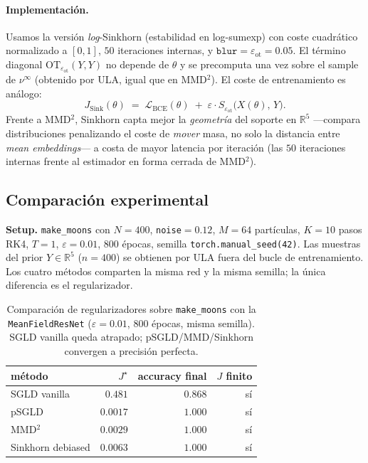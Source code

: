 \documentclass[11pt, a4paper]{article}
\theoremstyle{definition}
\newcommand{\R}{\mathbb{R}}
\newcommand{\eps}{\varepsilon}
\begin{document}
\paragraph{Implementación.} Usamos la versión \emph{log}-Sinkhorn
(estabilidad en log-sumexp) con coste cuadrático normalizado a
$[0,1]$, $50$ iteraciones internas, y $\texttt{blur}=
\eps_{\mathrm{ot}}=0.05$. El término diagonal
$\mathrm{OT}_{\eps_{\mathrm{ot}}}(Y, Y)$ no depende de $\theta$ y se
precomputa una vez sobre el sample de $\nu^\infty$ (obtenido por
ULA, igual que en MMD$^2$). El coste de entrenamiento es análogo:
\[
  J_{\mathrm{Sink}}(\theta) \;=\;
  \mathcal L_{\mathrm{BCE}}(\theta)
  \;+\; \eps\cdot S_{\eps_{\mathrm{ot}}}\bigl(X(\theta),\,Y\bigr).
\]
Frente a MMD$^2$, Sinkhorn capta mejor la \emph{geometría} del
soporte en $\R^5$ ---compara distribuciones penalizando el coste de
\emph{mover} masa, no solo la distancia entre \emph{mean
embeddings}--- a costa de mayor latencia por iteración (las $50$
iteraciones internas frente al estimador en forma cerrada de MMD$^2$).

\subsection{Comparación experimental}
\label{sec:reg-moons-exp}

\textbf{Setup.} \texttt{make\_moons} con $N=400$,
\texttt{noise}$=0.12$, $M=64$ partículas, $K=10$ pasos
RK4, $T=1$, $\eps=0.01$, $800$ épocas, semilla
\texttt{torch.manual\_seed(42)}. Las muestras del prior
$Y\in\mathbb R^5$ ($n=400$) se obtienen por ULA fuera del bucle de
entrenamiento. Los cuatro métodos comparten la misma red y la misma
semilla; la única diferencia es el regularizador.

\begin{table}[H]
\centering
\begin{tabular}{lrrr}
\toprule
método & $J^\star$ & accuracy final & $J$ finito \\
\midrule
SGLD vanilla       & $0.481$ & $0.868$ & sí \\
pSGLD              & $0.0017$ & $1.000$ & sí \\
MMD$^2$            & $0.0029$ & $1.000$ & sí \\
Sinkhorn debiased  & $0.0063$ & $1.000$ & sí \\
\bottomrule
\end{tabular}
\caption{Comparación de regularizadores sobre \texttt{make\_moons}
con la \texttt{MeanFieldResNet} ($\eps=0.01$, $800$ épocas, misma
semilla). SGLD vanilla queda atrapado; pSGLD/MMD/Sinkhorn convergen
a precisión perfecta. \label{tab:reg-moons}}
\end{table}
\end{document}
